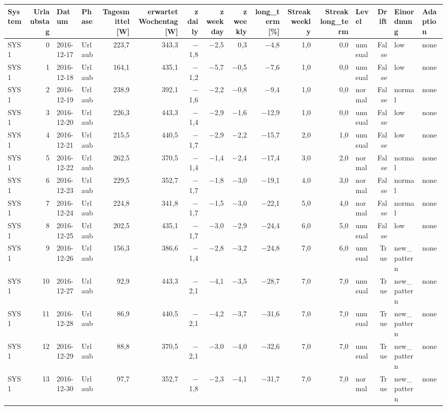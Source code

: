 \begin{tabular}{lrllrrrrrrrrlrll}
\toprule
System & Urlaubstag & Datum & Phase & Tagesmittel [W] & erwartet Wochentag [W] & z daily & z weekday & z weekly & long\_term [\%] & Streak weekly & Streak long\_term & Level & Drift & Einordnung & Adaption \\
\midrule
SYS1 & 0 & 2016-12-17 & Urlaub & 223,7 & 343,3 & $-$1,8 & $-$2,5 & 0,3 & $-$4,8 & 1,0 & 0,0 & unusual & False & low & none \\
SYS1 & 1 & 2016-12-18 & Urlaub & 164,1 & 435,1 & $-$1,2 & $-$5,7 & $-$0,5 & $-$7,6 & 1,0 & 0,0 & unusual & False & low & none \\
SYS1 & 2 & 2016-12-19 & Urlaub & 238,9 & 392,1 & $-$1,6 & $-$2,2 & $-$0,8 & $-$9,4 & 1,0 & 0,0 & normal & False & normal & none \\
SYS1 & 3 & 2016-12-20 & Urlaub & 226,3 & 443,3 & $-$1,4 & $-$2,9 & $-$1,6 & $-$12,9 & 1,0 & 0,0 & unusual & False & low & none \\
SYS1 & 4 & 2016-12-21 & Urlaub & 215,5 & 440,5 & $-$1,7 & $-$2,9 & $-$2,2 & $-$15,7 & 2,0 & 1,0 & unusual & False & low & none \\
SYS1 & 5 & 2016-12-22 & Urlaub & 262,5 & 370,5 & $-$1,4 & $-$1,4 & $-$2,4 & $-$17,4 & 3,0 & 2,0 & normal & False & normal & none \\
SYS1 & 6 & 2016-12-23 & Urlaub & 229,5 & 352,7 & $-$1,7 & $-$1,8 & $-$3,0 & $-$19,1 & 4,0 & 3,0 & normal & False & normal & none \\
SYS1 & 7 & 2016-12-24 & Urlaub & 224,8 & 341,8 & $-$1,7 & $-$1,5 & $-$3,0 & $-$22,1 & 5,0 & 4,0 & normal & False & normal & none \\
SYS1 & 8 & 2016-12-25 & Urlaub & 202,5 & 435,1 & $-$1,7 & $-$3,0 & $-$2,9 & $-$24,4 & 6,0 & 5,0 & unusual & False & low & none \\
SYS1 & 9 & 2016-12-26 & Urlaub & 156,3 & 386,6 & $-$1,4 & $-$2,8 & $-$3,2 & $-$24,8 & 7,0 & 6,0 & unusual & True & new\_pattern & none \\
SYS1 & 10 & 2016-12-27 & Urlaub & 92,9 & 443,3 & $-$2,1 & $-$4,1 & $-$3,5 & $-$28,7 & 7,0 & 7,0 & unusual & True & new\_pattern & none \\
SYS1 & 11 & 2016-12-28 & Urlaub & 86,9 & 440,5 & $-$2,1 & $-$4,2 & $-$3,7 & $-$31,6 & 7,0 & 7,0 & unusual & True & new\_pattern & none \\
SYS1 & 12 & 2016-12-29 & Urlaub & 88,8 & 370,5 & $-$2,1 & $-$3,0 & $-$4,0 & $-$32,6 & 7,0 & 7,0 & unusual & True & new\_pattern & none \\
SYS1 & 13 & 2016-12-30 & Urlaub & 97,7 & 352,7 & $-$1,8 & $-$2,3 & $-$4,1 & $-$31,7 & 7,0 & 7,0 & normal & True & new\_pattern & none \\

\end{tabular}
